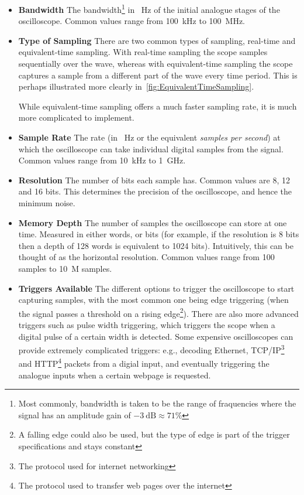 \begin{itemize}

  \item \textbf{Bandwidth} The bandwidth\footnote{Most commonly, bandwidth is
      taken to be the range of fraquencies where the signal has an amplitude
      gain of $\SI{-3}{\dB}\approx 71\%$} in \SI{}{\Hz} of the initial analogue
      stages of the oscilloscope. Common values range from \SI{100}{\kHz} to
      \SI{100}{\MHz}.

  \item \textbf{Type of Sampling} There are two common types of sampling,
    real-time and equivalent-time sampling. With real-time sampling the scope
    samples sequentially over the wave, whereas with equivalent-time sampling
    the scope captures a sample from a different part of the wave every time
    period. This is perhaps illustrated more clearly
    in~\cref{fig:EquivalentTimeSampling}.

  While equivalent-time sampling offers a much faster sampling rate, it is much
  more complicated to implement.

  \item \textbf{Sample Rate} The rate (in \SI{}{\Hz} or the equivalent
  \textit{samples per second}) at which the oscilloscope can take individual
  digital samples from the signal. Common values range from \SI{10}{\kHz} to
  \SI{1}{\GHz}.

  \item \textbf{Resolution} The number of bits each sample has. Common values
  are 8, 12 and 16 bits. This determines the precision of the oscilloscope, and
  hence the minimum noise.

  \item \textbf{Memory Depth} The number of samples the oscilloscope can store
  at one time. Measured in either words, or bits (for example, if the resolution
  is 8 bits then a depth of 128 words is equivalent to 1024 bits). Intuitively,
  this can be thought of as the horizontal resolution. Common values range from
  100 samples to \SI{10}{M} samples.

  \item \textbf{Triggers Available} The different options to trigger the
    oscilloscope to start capturing samples, with the most common one being edge
    triggering \autocite{PicotechTriggers} (when the signal passes a threshold
    on a rising edge\footnote{A falling edge could also be used, but the type of
    edge is part of the trigger specifications and stays constant}). There are
    also more advanced triggers such as pulse width triggering, which triggers
    the scope when a digital pulse of a certain width is detected. Some
    expensive oscilloscopes can provide extremely complicated triggers: e.g.,
    decoding Ethernet, TCP/IP\footnote{The protocol used for internet
    networking} and HTTP\footnote{The protocol used to transfer web pages over
    the internet} packets from a digial input, and eventually triggering the
    analogue inputs when a certain webpage is requested.


\end{itemize}
